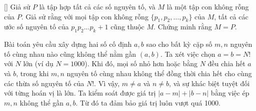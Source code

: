\documentclass[../09-contruction-methods.tex]{subfiles}
\begin{document}
\begin{example*}\label{example:USA-2015-TSTST-P3}[\textbf{}]
	Giả sử \( P \) là tập hợp tất cả các số nguyên tố, và \( M \) là một tập con không rỗng của \( P \).
	Giả sử rằng với mọi tập con không rỗng \( \{p_1, p_2, \ldots, p_k\} \) của \( M \), tất cả các ước số nguyên tố của \( p_1p_2\ldots p_k + 1 \) cũng thuộc \( M \).
	Chứng minh rằng \( M = P \).
\end{example*}

\begin{story*}
    Bài toán yêu cầu xây dựng hai số cố định \( a, b \) sao cho bất kỳ cặp số \( m, n \) nguyên tố cùng nhau nào cũng không thể nằm gần \( (a, b) \).
    Ta xét việc chọn \( a = b = N! \) với \( N \) lớn (ví dụ \( N = 1000 \)).
    Khi đó, mọi số nhỏ hơn hoặc bằng \( N \) đều chia hết \( a \) và \( b \),
    trong khi \( m, n \) nguyên tố cùng nhau không thể đồng thời chia hết cho cùng các thừa số nguyên tố của \( N! \).
    Vì vậy, \( m \ne a \) và \( n \ne b \), và sự khác biệt tuyệt đối với từng hoán vị là lớn.
    Ta kiểm soát được giá trị \( |a - m| + |b - n| \) bằng việc ép \( m, n \) không thể gần \( a, b \). Từ đó ta đảm bảo giá trị luôn vượt quá 1000.
\end{story*}

\bigbreak
\end{document}

